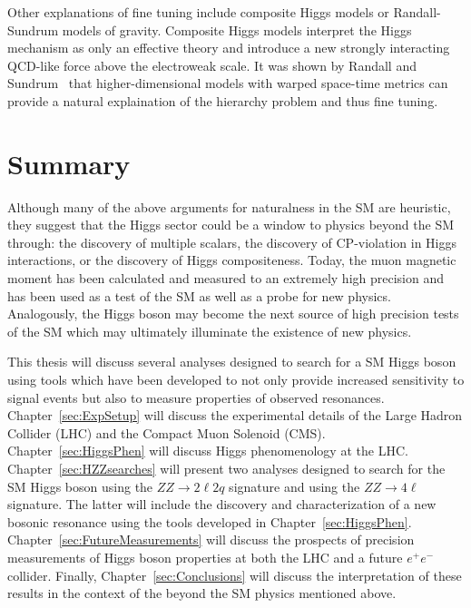 Other explanations of fine tuning include composite Higgs models
or Randall-Sundrum models of gravity.  Composite Higgs models 
interpret the Higgs mechanism as only an effective theory and
introduce a new strongly interacting QCD-like force above the 
electroweak scale.  It was shown by Randall and 
Sundrum~\cite{Randall:1999ee} that
higher-dimensional models with warped space-time metrics can 
provide a natural explaination of the hierarchy problem and
thus fine tuning.

\section{Summary}

Although many of the above arguments for naturalness in the SM 
are heuristic, they suggest that the Higgs sector could be a 
window to physics beyond
the SM through: the discovery of multiple scalars,
the discovery of CP-violation in Higgs interactions,
or the discovery of Higgs compositeness.  Today, the muon 
magnetic moment has been calculated and measured 
to an extremely high precision and has been used as a 
test of the SM as well as a probe for new physics.
Analogously, the Higgs boson may become the next source of high 
precision tests of the SM which may
ultimately illuminate the existence of new physics.

This thesis will discuss several analyses designed to search for 
a SM Higgs boson
using tools which have been developed to not only provide
increased sensitivity to signal events but also to measure 
properties of observed resonances. 
Chapter~\ref{sec:ExpSetup} will 
discuss the experimental details of the Large Hadron Collider 
(LHC) and the Compact Muon Solenoid (CMS). 
Chapter~\ref{sec:HiggsPhen} will discuss Higgs phenomenology 
at the LHC.  Chapter~\ref{sec:HZZsearches} will
present two analyses designed to search for the SM Higgs boson using the 
$ZZ\to2\ell 2q$ signature and using the $ZZ\to 4\ell$ signature. 
The latter will include the discovery and characterization of 
a new bosonic resonance using the tools developed in
Chapter~\ref{sec:HiggsPhen}.  Chapter~\ref{sec:FutureMeasurements} 
will discuss the prospects of precision measurements of Higgs boson
properties at both the LHC and a future $e^+e^-$ collider. Finally, 
Chapter~\ref{sec:Conclusions} will discuss the interpretation 
of these results in the context of the beyond the SM physics 
mentioned above.  

